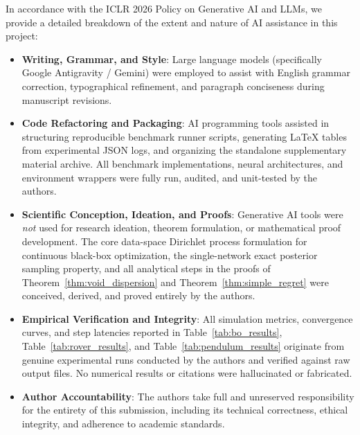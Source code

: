 \documentclass{article}
\begin{document}
In accordance with the ICLR 2026 Policy on Generative AI and LLMs, we provide a detailed breakdown of the extent and nature of AI assistance in this project:

\begin{itemize}
    \item \textbf{Writing, Grammar, and Style}: Large language models (specifically Google Antigravity / Gemini) were employed to assist with English grammar correction, typographical refinement, and paragraph conciseness during manuscript revisions.
    \item \textbf{Code Refactoring and Packaging}: AI programming tools assisted in structuring reproducible benchmark runner scripts, generating LaTeX tables from experimental JSON logs, and organizing the standalone supplementary material archive. All benchmark implementations, neural architectures, and environment wrappers were fully run, audited, and unit-tested by the authors.
    \item \textbf{Scientific Conception, Ideation, and Proofs}: Generative AI tools were \emph{not} used for research ideation, theorem formulation, or mathematical proof development. The core data-space Dirichlet process formulation for continuous black-box optimization, the single-network exact posterior sampling property, and all analytical steps in the proofs of Theorem~\ref{thm:void_dispersion} and Theorem~\ref{thm:simple_regret} were conceived, derived, and proved entirely by the authors.
    \item \textbf{Empirical Verification and Integrity}: All simulation metrics, convergence curves, and step latencies reported in Table~\ref{tab:bo_results}, Table~\ref{tab:rover_results}, and Table~\ref{tab:pendulum_results} originate from genuine experimental runs conducted by the authors and verified against raw output files. No numerical results or citations were hallucinated or fabricated.
    \item \textbf{Author Accountability}: The authors take full and unreserved responsibility for the entirety of this submission, including its technical correctness, ethical integrity, and adherence to academic standards.
\end{itemize}
\end{document}
